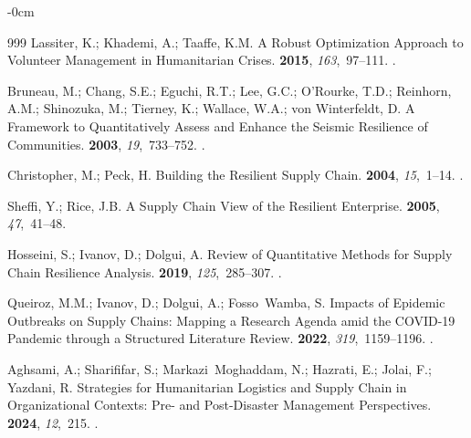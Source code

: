 \documentclass[systems,article,accept,moreauthors,pdftex]{Definitions/mdpi}
\begin{document}
\begin{adjustwidth}{-\extralength}{0cm}
\begin{thebibliography}{999}
Lassiter, K.; Khademi, A.; Taaffe, K.M.
\newblock A Robust Optimization Approach to Volunteer Management in
  Humanitarian Crises.
 {\bf 2015}, {\em
  163},~97--111.
.

Bruneau, M.; Chang, S.E.; Eguchi, R.T.; Lee, G.C.; O'Rourke, T.D.; Reinhorn,
  A.M.; Shinozuka, M.; Tierney, K.; Wallace, W.A.; \linebreak  von Winterfeldt, D.
\newblock A Framework to Quantitatively Assess and Enhance the Seismic
  Resilience of Communities.
 {\bf 2003}, {\em 19},~733--752.
.

Christopher, M.; Peck, H.
\newblock Building the Resilient Supply Chain.
 {\bf 2004},
  {\em 15},~1--14.
.

Sheffi, Y.; Rice, J.B.
\newblock A Supply Chain View of the Resilient Enterprise.
 {\bf 2005}, {\em 47},~41--48.

Hosseini, S.; Ivanov, D.; Dolgui, A.
\newblock Review of Quantitative Methods for Supply Chain Resilience Analysis.
 {\bf 2019}, {\em 125},~285--307.
.

Queiroz, M.M.; Ivanov, D.; Dolgui, A.; Fosso~Wamba, S.
\newblock Impacts of Epidemic Outbreaks on Supply Chains: Mapping a Research
  Agenda amid the {COVID-19} Pandemic through a Structured Literature Review.
 {\bf 2022}, {\em
  319},~1159--1196.
.

Aghsami, A.; Sharififar, S.; Markazi~Moghaddam, N.; Hazrati, E.; Jolai, F.;
  Yazdani, R.
\newblock Strategies for Humanitarian Logistics and Supply Chain in
  Organizational Contexts: Pre- and Post-Disaster Management Perspectives.
 {\bf 2024}, {\em 12},~215.
.


\end{thebibliography}
\end{adjustwidth}
\end{document}
